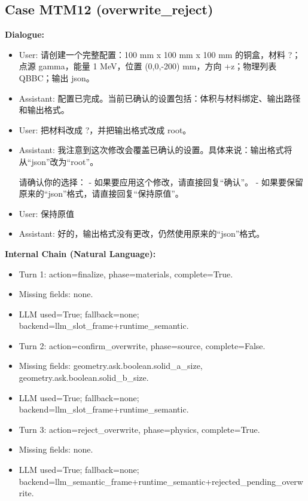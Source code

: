 \documentclass[11pt]{ctexart}
\begin{document}
\subsection{Case MTM12 (overwrite\_reject)}
\textbf{Dialogue:}
\begin{itemize}
\item User: 请创建一个完整配置：100 mm x 100 mm x 100 mm 的铜盒，材料 ?；点源 gamma，能量 1 MeV，位置 (0,0,-200) mm，方向 +z；物理列表 QBBC；输出 json。
\item Assistant: 配置已完成。当前已确认的设置包括：体积与材料绑定、输出路径和输出格式。
\item User: 把材料改成 ?，并把输出格式改成 root。
\item Assistant: 我注意到这次修改会覆盖已确认的设置。具体来说：输出格式将从“json”改为“root”。

请确认你的选择：
- 如果要应用这个修改，请直接回复“确认”。
- 如果要保留原来的“json”格式，请直接回复“保持原值”。
\item User: 保持原值
\item Assistant: 好的，输出格式没有更改，仍然使用原来的“json”格式。
\end{itemize}
\textbf{Internal Chain (Natural Language):}
\begin{itemize}
\item Turn 1: action=finalize, phase=materials, complete=True.
\item Missing fields: none.
\item LLM used=True; fallback=none; backend=llm\_slot\_frame+runtime\_semantic.
\item Turn 2: action=confirm\_overwrite, phase=source, complete=False.
\item Missing fields: geometry.ask.boolean.solid\_a\_size, geometry.ask.boolean.solid\_b\_size.
\item LLM used=True; fallback=none; backend=llm\_slot\_frame+runtime\_semantic.
\item Turn 3: action=reject\_overwrite, phase=physics, complete=True.
\item Missing fields: none.
\item LLM used=True; fallback=none; backend=llm\_semantic\_frame+runtime\_semantic+rejected\_pending\_overwrite.
\end{itemize}
\end{document}
